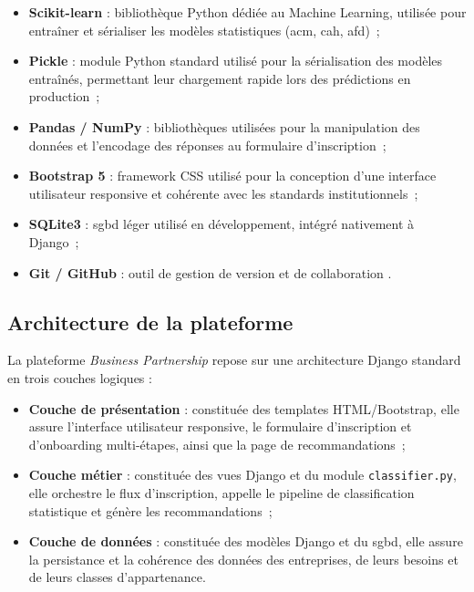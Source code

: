 \documentclass[12pt, a4paper, oneside]{report}
\begin{document}
\begin{itemize}
  \item \textbf{Scikit-learn} \cite{sklearn} : bibliothèque Python dédiée au Machine Learning, utilisée pour entraîner et sérialiser les modèles statistiques (\gls{acm}, \gls{cah}, \gls{afd})~;
  \item \textbf{Pickle} : module Python standard utilisé pour la sérialisation des modèles entraînés, permettant leur chargement rapide lors des prédictions en production~;
  \item \textbf{Pandas / NumPy} \cite{mckinney2010} : bibliothèques utilisées pour la manipulation des données et l'encodage des réponses au formulaire d'inscription~;
  \item \textbf{Bootstrap 5} \cite{bootstrap} : framework CSS utilisé pour la conception d'une interface utilisateur responsive et cohérente avec les standards institutionnels~;
  \item \textbf{SQLite3} : \gls{sgbd} léger utilisé en développement, intégré nativement à Django~;
  \item \textbf{Git / GitHub} : outil de gestion de version et de collaboration \cite{chacon2014}.
\end{itemize}

\subsection{Architecture de la plateforme}

La plateforme \textit{Business Partnership} repose sur une architecture Django standard en trois couches logiques :

\begin{itemize}
  \item \textbf{Couche de présentation} : constituée des templates HTML/Bootstrap, elle assure l'interface utilisateur responsive, le formulaire d'inscription et d'onboarding multi-étapes, ainsi que la page de recommandations~;

  \item \textbf{Couche métier} : constituée des vues Django et du module \texttt{classifier.py}, elle orchestre le flux d'inscription, appelle le pipeline de classification statistique et génère les recommandations~;

  \item \textbf{Couche de données} : constituée des modèles Django et du \gls{sgbd}, elle assure la persistance et la cohérence des données des entreprises, de leurs besoins et de leurs classes d'appartenance.
\end{itemize}
\end{document}
